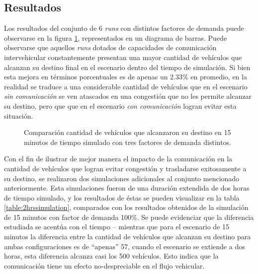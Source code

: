 \subsection{Resultados}

Los resultados del conjunto de 6 \emph{runs} con distintos factores de demanda puede observarse en la figura \ref{fig:arrivedcomp}, representados en un diagrama de barras. Puede observarse que aquellos \emph{runs} dotados de capacidades de comunicación intervehicular constantemente presentan una mayor cantidad de vehículos que alcanzan su destino final en el escenario dentro del tiempo de simulación. Si bien esta mejora en términos porcentuales es de apenas un 2.33\% en promedio, en la realidad se traduce a una considerable cantidad de vehículos que en el escenario \emph{sin comunicación} se ven atascados en una congestión que no les permite alcanzar su destino, pero que que en el escenario \emph{con comunicación} logran evitar esta situación.

\begin{figure}[tpb]
    \centering
    
    \caption[Comparación cantidad de vehículos que alcanzaron su destino]{Comparación cantidad de vehículos que alcanzaron su destino en 15 minutos de tiempo simulado con tres factores de demanda distintos.}
    \label{fig:arrivedcomp}
\end{figure}

Con el fin de ilustrar de mejor manera el impacto de la comunicación en la cantidad de vehículos que logran evitar congestión y trasladarse exitosamente a su destino, se realizaron dos simulaciones adicionales al conjunto mencionado anteriormente. Esta simulaciones fueron de una duración extendida de dos horas de tiempo simulado, y los resultados de éstas se pueden visualizar en la tabla \ref{table:2hrssimulation}, comparados con los resultados obtenidos de la simulación de 15 minutos con factor de demanda 100\%. Se puede evidenciar que la diferencia estudiada se acentúa con el tiempo -- mientras que para el escenario de 15 minutos la diferencia entre la cantidad de vehículos que alcanzan su destino para ambas configuraciones es de ``apenas'' 57, cuando el escenario se extiende a dos horas, esta diferencia alcanza casi los 500 vehículos. Esto indica que la comunicación tiene un efecto no-despreciable en el flujo vehicular.

